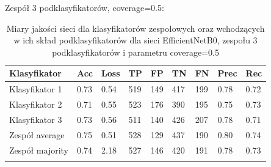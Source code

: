 \documentclass[polish,12pt]{aghthesis}
\begin{document}
\vspace{3mm}
\noindent Zespół 3 podklasyfikatorów, coverage=0.5:
\renewcommand{\arraystretch}{1.75}
 \begin{longtable}[h!]{|m{2.6cm}|m{1.2cm}|m{1.2cm}|m{1.2cm}|m{1.2cm}|m{1.2cm}|m{1.2cm}|m{1.2cm}|m{1.2cm}|}
 \hline
 Klasyfikator & Acc & Loss & TP & FP & TN & FN & Prec & Rec\\
 \hline
 Klasyfikator 1 & 0.73 & 0.54 & 519 & 149 & 417 & 199 & 0.78 & 0.72\\
 \hline
 Klasyfikator 2 & 0.71 & 0.55 & 523 & 176 & 390 & 195 & 0.75 & 0.73\\
 \hline
 Klasyfikator 3 & 0.73 & 0.56 & 511 & 140 & 426 & 207 & 0.78 & 0.71\\
 \hline
 Zespół average & 0.75 & 0.51 & 528 & 129 & 437 & 190 & 0.80 & 0.74\\ 
 \hline
 Zespół \newline majority & 0.74 & 2.18 & 527 & 146 & 420 & 191 & 0.78 & 0.73\\
 \hline
\caption{Miary jakości sieci dla klasyfikatorów zespołowych oraz wchodzących w ich skład podklasyfikatorów dla sieci EfficientNetB0, zespołu 3 podklasyfikatorów i parametru coverage=0.5}
\label{table:30}
\end{longtable}
\end{document}
